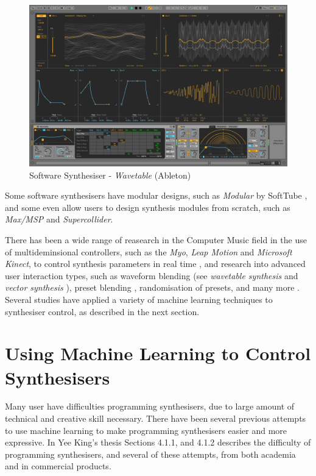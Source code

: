\documentclass[11pt, oneside]{report}   	%
\begin{document}
\begin{figure}[h] 
	\centering
	\includegraphics[width = 5in]{AbletonWavetable.jpg}
	\caption{Software Synthesiser - \emph{Wavetable} (Ableton)\cite{Wavetable} }
	\label{fig:AbletonWavetable}
\end{figure}

Some software synthesisers have modular designs, such as \emph{Modular} by SoftTube \cite{SoftTube}, and some even allow users to design synthesis modules from scratch, such as \emph{Max/MSP} and \emph{Supercollider}.

There has been a wide range of reasearch in the Computer Music field in the use of multideminsional controllers, such as the  \emph{Myo}, \emph{Leap Motion} and \emph{Microsoft Kinect}, to control synthesis parameters in real time \cite{ICMC, TubbThesis}, and research into advanced user interaction types, such as waveform blending (see \emph{wavetable synthesis}\cite{Wavetable} and \emph{vector synthesis} \cite{SY22}), preset blending \cite{Interpolation}, randomisation of presets, and many more \cite{YeeKing, EvolvedAudioEffects}.  Several studies have applied a variety of machine learning techniques to synthesiser control, as described in the next section.

\section{Using Machine Learning to Control Synthesisers}
Many user have difficulties programming synthesisers, due to large amount of technical and creative skill necessary. There have been several previous attempts to use machine learning to make programming synthesisers easier and more expressive. In Yee King's thesis \cite{YeeKing} Sections 4.1.1, and 4.1.2 describes the difficulty of programming synthesisers, and several of these attempts, from both academia and in commercial products.
\end{document}
